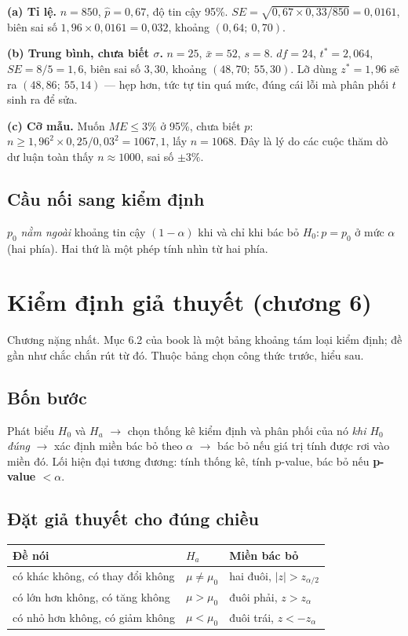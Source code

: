 \documentclass[11pt]{article}
\begin{document}
\textbf{(a) Tỉ lệ.} $n=850$, $\hat p = 0{,}67$, độ tin cậy 95\%.
$SE = \sqrt{0{,}67 \times 0{,}33/850} = 0{,}0161$, biên sai số
$1{,}96 \times 0{,}0161 = 0{,}032$, khoảng $(0{,}64;\ 0{,}70)$.

\textbf{(b) Trung bình, chưa biết $\sigma$.} $n=25$, $\bar x = 52$, $s=8$.
$df=24$, $t^{*}=2{,}064$, $SE = 8/5 = 1{,}6$, biên sai số $3{,}30$, khoảng
$(48{,}70;\ 55{,}30)$. Lỡ dùng $z^{*}=1{,}96$ sẽ ra $(48{,}86;\ 55{,}14)$ ---
hẹp hơn, tức tự tin quá mức, đúng cái lỗi mà phân phối $t$ sinh ra để sửa.

\textbf{(c) Cỡ mẫu.} Muốn $ME \le 3\%$ ở 95\%, chưa biết $p$:
$n \ge 1{,}96^2 \times 0{,}25/0{,}03^2 = 1067{,}1$, lấy $n=1068$. Đây là lý do các
cuộc thăm dò dư luận toàn thấy $n \approx 1000$, sai số $\pm 3\%$.

\subsection*{Cầu nối sang kiểm định}

$p_0$ \emph{nằm ngoài} khoảng tin cậy $(1-\alpha)$ khi và chỉ khi bác bỏ
$H_0: p=p_0$ ở mức $\alpha$ (hai phía). Hai thứ là một phép tính nhìn từ hai phía.

\section{Kiểm định giả thuyết (chương 6)}\label{sec:kiemdinh}

Chương nặng nhất. Mục 6.2 của book là một bảng khoảng tám loại kiểm định; đề gần
như chắc chắn rút từ đó. Thuộc bảng chọn công thức trước, hiểu sau.

\subsection*{Bốn bước}

Phát biểu $H_0$ và $H_a$ $\to$ chọn thống kê kiểm định và phân phối của nó
\emph{khi $H_0$ đúng} $\to$ xác định miền bác bỏ theo $\alpha$ $\to$ bác bỏ nếu
giá trị tính được rơi vào miền đó. Lối hiện đại tương đương: tính thống kê, tính
p-value, bác bỏ nếu \textbf{p-value $< \alpha$}.

\subsection*{Đặt giả thuyết cho đúng chiều}

\begin{center}
\begin{tabular}{@{}lll@{}}
\toprule
\textbf{Đề nói} & \textbf{$H_a$} & \textbf{Miền bác bỏ} \\
\midrule
có khác không, có thay đổi không & $\mu \ne \mu_0$ & hai đuôi, $|z| > z_{\alpha/2}$ \\
có lớn hơn không, có tăng không & $\mu > \mu_0$ & đuôi phải, $z > z_\alpha$ \\
có nhỏ hơn không, có giảm không & $\mu < \mu_0$ & đuôi trái, $z < -z_\alpha$ \\
\bottomrule
\end{tabular}
\end{center}
\end{document}
